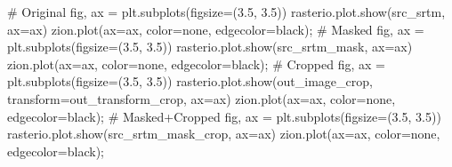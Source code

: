 \documentclass[
  letterpaper,
]{krantz}
\newenvironment{Shaded}{\begin{snugshade}}{\end{snugshade}}
\newcommand{\CommentTok}[1]{\textcolor[rgb]{0.37,0.37,0.37}{#1}}
\newcommand{\FloatTok}[1]{\textcolor[rgb]{0.68,0.00,0.00}{#1}}
\newcommand{\NormalTok}[1]{\textcolor[rgb]{0.00,0.23,0.31}{#1}}
\newcommand{\OperatorTok}[1]{\textcolor[rgb]{0.37,0.37,0.37}{#1}}
\newcommand{\StringTok}[1]{\textcolor[rgb]{0.13,0.47,0.30}{#1}}
\begin{document}
\begin{Shaded}
\begin{Highlighting}[]
\CommentTok{\# Original}
\NormalTok{fig, ax }\OperatorTok{=}\NormalTok{ plt.subplots(figsize}\OperatorTok{=}\NormalTok{(}\FloatTok{3.5}\NormalTok{, }\FloatTok{3.5}\NormalTok{))}
\NormalTok{rasterio.plot.show(src\_srtm, ax}\OperatorTok{=}\NormalTok{ax)}
\NormalTok{zion.plot(ax}\OperatorTok{=}\NormalTok{ax, color}\OperatorTok{=}\StringTok{\textquotesingle{}none\textquotesingle{}}\NormalTok{, edgecolor}\OperatorTok{=}\StringTok{\textquotesingle{}black\textquotesingle{}}\NormalTok{)}\OperatorTok{;}
\CommentTok{\# Masked}
\NormalTok{fig, ax }\OperatorTok{=}\NormalTok{ plt.subplots(figsize}\OperatorTok{=}\NormalTok{(}\FloatTok{3.5}\NormalTok{, }\FloatTok{3.5}\NormalTok{))}
\NormalTok{rasterio.plot.show(src\_srtm\_mask, ax}\OperatorTok{=}\NormalTok{ax)}
\NormalTok{zion.plot(ax}\OperatorTok{=}\NormalTok{ax, color}\OperatorTok{=}\StringTok{\textquotesingle{}none\textquotesingle{}}\NormalTok{, edgecolor}\OperatorTok{=}\StringTok{\textquotesingle{}black\textquotesingle{}}\NormalTok{)}\OperatorTok{;}
\CommentTok{\# Cropped}
\NormalTok{fig, ax }\OperatorTok{=}\NormalTok{ plt.subplots(figsize}\OperatorTok{=}\NormalTok{(}\FloatTok{3.5}\NormalTok{, }\FloatTok{3.5}\NormalTok{))}
\NormalTok{rasterio.plot.show(out\_image\_crop, transform}\OperatorTok{=}\NormalTok{out\_transform\_crop, ax}\OperatorTok{=}\NormalTok{ax)}
\NormalTok{zion.plot(ax}\OperatorTok{=}\NormalTok{ax, color}\OperatorTok{=}\StringTok{\textquotesingle{}none\textquotesingle{}}\NormalTok{, edgecolor}\OperatorTok{=}\StringTok{\textquotesingle{}black\textquotesingle{}}\NormalTok{)}\OperatorTok{;}
\CommentTok{\# Masked+Cropped}
\NormalTok{fig, ax }\OperatorTok{=}\NormalTok{ plt.subplots(figsize}\OperatorTok{=}\NormalTok{(}\FloatTok{3.5}\NormalTok{, }\FloatTok{3.5}\NormalTok{))}
\NormalTok{rasterio.plot.show(src\_srtm\_mask\_crop, ax}\OperatorTok{=}\NormalTok{ax)}
\NormalTok{zion.plot(ax}\OperatorTok{=}\NormalTok{ax, color}\OperatorTok{=}\StringTok{\textquotesingle{}none\textquotesingle{}}\NormalTok{, edgecolor}\OperatorTok{=}\StringTok{\textquotesingle{}black\textquotesingle{}}\NormalTok{)}\OperatorTok{;}
\end{Highlighting}
\end{Shaded}
\end{document}
